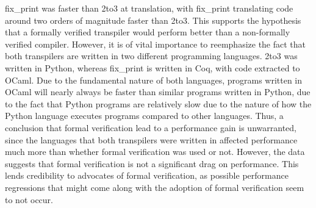 

fix\_print was faster than 2to3 at translation, with fix\_print translating code around two orders of magnitude faster than 2to3. This supports the hypothesis that a formally verified transpiler would perform better than a non-formally verified compiler. However, it is of vital importance to reemphasize the fact that both transpilers are written in two different programming languages. 2to3 was written in Python, whereas fix\_print is written in Coq, with code extracted to OCaml. Due to the fundamental nature of both languages, programs written in OCaml will nearly always be faster than similar programs written in Python, due to the fact that Python programs are relatively slow due to the nature of how the Python language executes programs compared to other languages. Thus, a conclusion that formal verification lead to a performance gain is unwarranted, since the languages that both transpilers were written in affected performance much more than whether formal verification was used or not. However, the data suggests that formal verification is not a significant drag on performance. This lends credibility to advocates of formal verification, as possible performance regressions that might come along with the adoption of formal verification seem to not occur.


